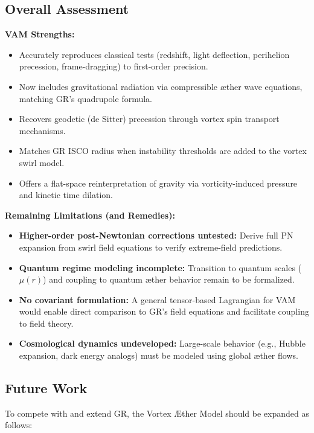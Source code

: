 \documentclass[a4paper, aps,preprint,superscriptaddress, 12pt]{revtex4}
\begin{document}
\subsection*{Overall Assessment}

\textbf{VAM Strengths:}
\begin{itemize}
    \item Accurately reproduces classical tests (redshift, light deflection, perihelion precession, frame-dragging) to first-order precision.
    \item Now includes gravitational radiation via compressible æther wave equations, matching GR's quadrupole formula.
    \item Recovers geodetic (de Sitter) precession through vortex spin transport mechanisms.
    \item Matches GR ISCO radius when instability thresholds are added to the vortex swirl model.
    \item Offers a flat-space reinterpretation of gravity via vorticity-induced pressure and kinetic time dilation.
\end{itemize}

\textbf{Remaining Limitations (and Remedies):}
\begin{itemize}
    \item \textbf{Higher-order post-Newtonian corrections untested:} Derive full PN expansion from swirl field equations to verify extreme-field predictions.
    \item \textbf{Quantum regime modeling incomplete:} Transition to quantum scales (\( \mu(r) \)) and coupling to quantum æther behavior remain to be formalized.
    \item \textbf{No covariant formulation:} A general tensor-based Lagrangian for VAM would enable direct comparison to GR's field equations and facilitate coupling to field theory.
    \item \textbf{Cosmological dynamics undeveloped:} Large-scale behavior (e.g., Hubble expansion, dark energy analogs) must be modeled using global æther flows.
\end{itemize}

\subsection*{Future Work}

To compete with and extend GR, the Vortex Æther Model should be expanded as follows:
\end{document}
